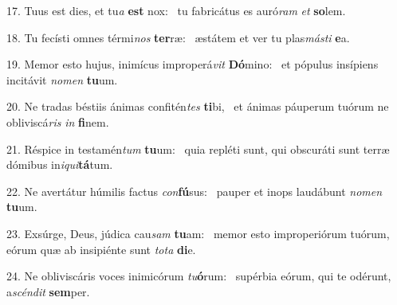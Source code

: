 17. Tuus est dies, et tu\textit{a} \textbf{est} nox: \ast\  tu fabricátus es auró\textit{ram} \textit{et} \textbf{so}lem.\

18. Tu fecísti omnes térmi\textit{nos} \textbf{ter}ræ: \ast\  æstátem et ver tu plas\textit{más}\textit{ti} \textbf{e}a.\

19. Memor esto hujus, inimícus improperá\textit{vit} \textbf{Dó}mino: \ast\  et pópulus insípiens incitávit \textit{no}\textit{men} \textbf{tu}um.\

20. Ne tradas béstiis ánimas confitén\textit{tes} \textbf{ti}bi, \ast\  et ánimas páuperum tuórum ne obliviscá\textit{ris} \textit{in} \textbf{fi}nem.\

21. Réspice in testamén\textit{tum} \textbf{tu}um: \ast\  quia repléti sunt, qui obscuráti sunt terræ dómibus in\textit{i}\textit{qui}\textbf{tá}tum.\

22. Ne avertátur húmilis factus \textit{con}\textbf{fú}sus: \ast\  pauper et inops laudábunt \textit{no}\textit{men} \textbf{tu}um.\

23. Exsúrge, Deus, júdica cau\textit{sam} \textbf{tu}am: \ast\  memor esto improperiórum tuórum, eórum quæ ab insipiénte sunt \textit{to}\textit{ta} \textbf{di}e.\

24. Ne obliviscáris voces inimicórum \textit{tu}\textbf{ó}rum: \ast\  supérbia eórum, qui te odérunt, a\textit{scén}\textit{dit} \textbf{sem}per.\

